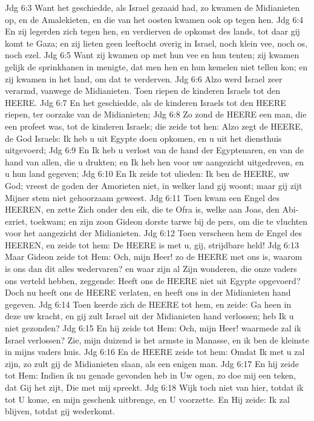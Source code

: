 Jdg 6:3  Want het geschiedde, als Israel gezaaid had, zo kwamen de Midianieten op, en de Amalekieten, en die van het oosten kwamen ook op tegen hen.
Jdg 6:4  En zij legerden zich tegen hen, en verdierven de opkomst des lands, tot daar gij komt te Gaza; en zij lieten geen leeftocht overig in Israel, noch klein vee, noch os, noch ezel.
Jdg 6:5  Want zij kwamen op met hun vee en hun tenten; zij kwamen gelijk de sprinkhanen in menigte, dat men hen en hun kemelen niet tellen kon; en zij kwamen in het land, om dat te verderven.
Jdg 6:6  Alzo werd Israel zeer verarmd, vanwege de Midianieten. Toen riepen de kinderen Israels tot den HEERE.
Jdg 6:7  En het geschiedde, als de kinderen Israels tot den HEERE riepen, ter oorzake van de Midianieten;
Jdg 6:8  Zo zond de HEERE een man, die een profeet was, tot de kinderen Israels; die zeide tot hen: Alzo zegt de HEERE, de God Israels: Ik heb u uit Egypte doen opkomen, en u uit het diensthuis uitgevoerd;
Jdg 6:9  En Ik heb u verlost van de hand der Egyptenaren, en van de hand van allen, die u drukten; en Ik heb hen voor uw aangezicht uitgedreven, en u hun land gegeven;
Jdg 6:10  En Ik zeide tot ulieden: Ik ben de HEERE, uw God; vreest de goden der Amorieten niet, in welker land gij woont; maar gij zijt Mijner stem niet gehoorzaam geweest.
Jdg 6:11  Toen kwam een Engel des HEEREN, en zette Zich onder den eik, die te Ofra is, welke aan Joas, den Abi-ezriet, toekwam; en zijn zoon Gideon dorste tarwe bij de pers, om die te vluchten voor het aangezicht der Midianieten.
Jdg 6:12  Toen verscheen hem de Engel des HEEREN, en zeide tot hem: De HEERE is met u, gij, strijdbare held!
Jdg 6:13  Maar Gideon zeide tot Hem: Och, mijn Heer! zo de HEERE met ons is, waarom is ons dan dit alles wedervaren? en waar zijn al Zijn wonderen, die onze vaders ons verteld hebben, zeggende: Heeft ons de HEERE niet uit Egypte opgevoerd? Doch nu heeft ons de HEERE verlaten, en heeft ons in der Midianieten hand gegeven.
Jdg 6:14  Toen keerde zich de HEERE tot hem, en zeide: Ga heen in deze uw kracht, en gij zult Israel uit der Midianieten hand verlossen; heb Ik u niet gezonden?
Jdg 6:15  En hij zeide tot Hem: Och, mijn Heer! waarmede zal ik Israel verlossen? Zie, mijn duizend is het armste in Manasse, en ik ben de kleinste in mijns vaders huis.
Jdg 6:16  En de HEERE zeide tot hem: Omdat Ik met u zal zijn, zo zult gij de Midianieten slaan, als een enigen man.
Jdg 6:17  En hij zeide tot Hem: Indien ik nu genade gevonden heb in Uw ogen, zo doe mij een teken, dat Gij het zijt, Die met mij spreekt.
Jdg 6:18  Wijk toch niet van hier, totdat ik tot U kome, en mijn geschenk uitbrenge, en U voorzette. En Hij zeide: Ik zal blijven, totdat gij wederkomt.
